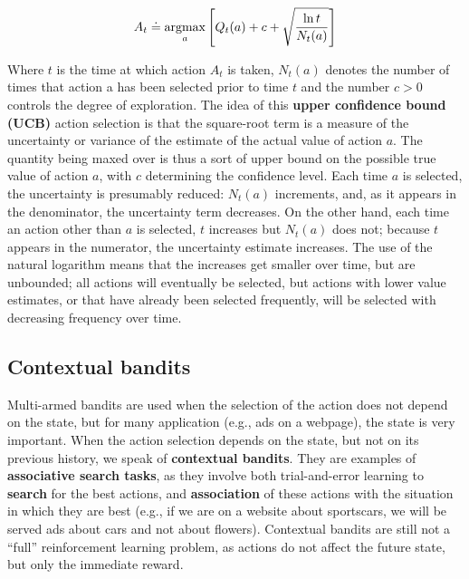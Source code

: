 \begin{equation}
    A_t \doteq \operatorname*{argmax}_a \Bigg[ Q_t (a) + c + \sqrt{\frac{\ln{t}}{N_t (a)}} \Bigg]
    \label{eq:ch3-upperconfidenceboundactionselection}
\end{equation}

Where $t$ is the time at which action $A_t$ is taken, $N_t (a)$ denotes the number of times that action a has been selected prior to time $t$ and the number $c > 0$ controls the degree of exploration. The idea of this \textbf{upper confidence bound (UCB)} action selection is that the square-root term is a measure of the uncertainty or variance of the estimate of the actual value of action $a$. The quantity being maxed over is thus a sort of upper bound on the possible true value of action $a$, with $c$ determining the confidence level. Each time $a$ is selected, the uncertainty is presumably reduced: $N_t (a)$ increments, and, as it appears in the denominator, the uncertainty term decreases. On the other hand, each time an action other than $a$ is selected, $t$ increases but $N_t (a)$ does not; because $t$ appears in the numerator, the uncertainty estimate increases. The use of the natural logarithm means that the increases get smaller over time, but are unbounded; all actions will eventually be selected, but actions with lower value estimates, or that have already been selected frequently, will be selected with decreasing frequency over time.

\subsection{Contextual bandits}
Multi-armed bandits are used when the selection of the action does not depend on the state, but for many application (e.g., ads on a webpage), the state is very important. When the action selection depends on the state, but not on its previous history, we speak of \textbf{contextual bandits}. They are examples of \textbf{associative search tasks}, as they involve both trial-and-error learning to \textbf{search} for the best actions, and \textbf{association} of these actions with the situation in which they are best (e.g., if we are on a website about sportscars, we will be served ads about cars and not about flowers). Contextual bandits are still not a ``full'' reinforcement learning problem, as actions do not affect the future state, but only the immediate reward.